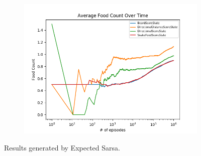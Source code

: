 \documentclass[result.tex]{subfiles}
\begin{document}
\begin{figure}[ht]
        \begin{subfigure}[b]{.35\linewidth}
            \includegraphics[width=\linewidth]{../images/expected_sarsa/state/234/score_average_food_count_over_time.png}
        \end{subfigure}
        \caption{Results generated by Expected Sarsa.}
        \label{fig:state_result_expected_sarsa}
    \end{figure}
\end{document}
